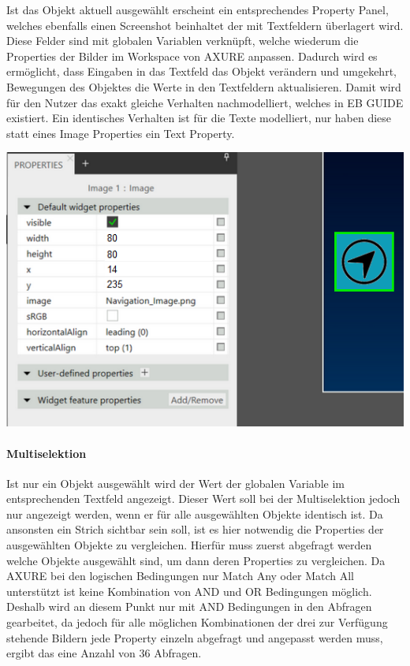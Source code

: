 Ist das Objekt aktuell ausgewählt erscheint ein entsprechendes Property Panel, welches ebenfalls einen Screenshot beinhaltet der mit Textfeldern überlagert wird.
Diese Felder sind mit globalen Variablen verknüpft, welche wiederum die Properties der Bilder im Workspace von AXURE anpassen.
Dadurch wird es ermöglicht, dass Eingaben in das Textfeld das Objekt verändern und umgekehrt, Bewegungen des Objektes die Werte in den Textfeldern aktualisieren.
Damit wird für den Nutzer das exakt gleiche Verhalten nachmodelliert, welches in EB GUIDE existiert.
Ein identisches Verhalten ist für die Texte modelliert, nur haben diese statt eines Image Properties ein Text Property.

\begin{center}
  \includegraphics[scale=0.8]{figures/Prototyp_04.PNG}
  \label{fig:Prototyp_04}
\end{center}

\paragraph{Multiselektion}
Ist nur ein Objekt ausgewählt wird der Wert der globalen Variable im entsprechenden Textfeld angezeigt.
Dieser Wert soll bei der Multiselektion jedoch nur angezeigt werden, wenn er für alle ausgewählten Objekte identisch ist.
Da ansonsten ein Strich sichtbar sein soll, ist es hier notwendig die Properties der ausgewählten Objekte zu vergleichen.
Hierfür muss zuerst abgefragt werden welche Objekte ausgewählt sind, um dann deren Properties zu vergleichen.
Da AXURE bei den logischen Bedingungen nur \glqq Match Any\grqq{} oder \glqq Match All\grqq{} unterstützt ist keine Kombination von AND und OR Bedingungen möglich.
Deshalb wird an diesem Punkt nur mit AND Bedingungen in den Abfragen gearbeitet, da jedoch für alle möglichen Kombinationen der drei zur Verfügung stehende Bildern jede Property einzeln abgefragt und angepasst werden muss, ergibt das eine Anzahl von 36 Abfragen.

